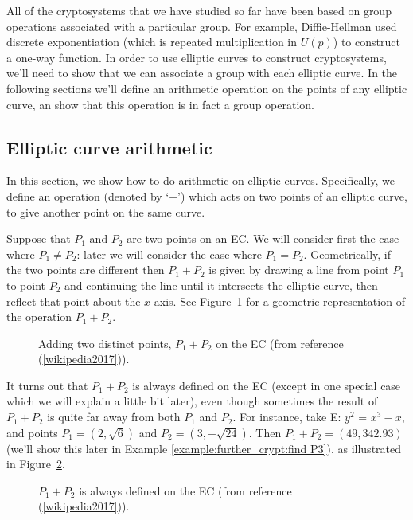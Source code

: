 All of the cryptosystems that we have studied so far have been based on group operations associated with a particular group. For example, Diffie-Hellman used discrete exponentiation (which is repeated multiplication in $U(p)$) to construct a one-way function. In order to  use elliptic curves to construct cryptosystems, we'll need to show that we can associate a group with each elliptic curve. In the following sections we'll define an arithmetic operation on the points of  any  elliptic curve, an  show that this operation is in fact a group operation.

\subsection{Elliptic curve arithmetic}\label{sec:ECA}
In this section, we show how to do arithmetic on elliptic curves. Specifically, we define an operation (denoted by `+') which acts on two points of an elliptic curve, to give another point on the same curve. 

Suppose that $P_1$ and $P_2$ are two points on an EC. We will consider first the case where $P_1 \neq P_2$: later we will consider the case where  $P_1= P_2$. Geometrically, if the two points are different then $P_1 + P_2$ is given by drawing a line from point $P_1$ to point $P_2$ and continuing the line until it intersects the elliptic curve, then reflect that point about the $x$-axis.  See Figure~\ref{fig:DH:DHKE_6} for a geometric representation of the operation $P_1+P_2$.

\begin{figure}[htbp]
	  \caption{\label{fig:DH:DHKE_6}Adding two distinct points, $P_1 + P_2$ on the EC (from reference (\ref{wikipedia2017})).}
\end{figure}

It turns out that $P_1 + P_2$ is always defined on the EC (except in one special case which we will explain a little bit later), even though sometimes the result of $P_1 + P_2$ is quite far away from both $P_1$ and $P_2$.  For instance, take E: $ y^2$ = $x^3 - x$, and points $P_1 = (2, \sqrt{6})$ and $P_2 = (3, -\sqrt{24})$.  Then $P_1 + P_2 = (49,342.93)$ (we'll show this later in Example \ref{example:further_crypt:find P3}), as illustrated in Figure~\ref{fig:DH:DHKE_16}. 
\begin{figure}[htbp]
	  \caption{\label{fig:DH:DHKE_16} $P_1 + P_2$ is always defined on the EC (from reference (\ref{wikipedia2017})).}
\end{figure}

